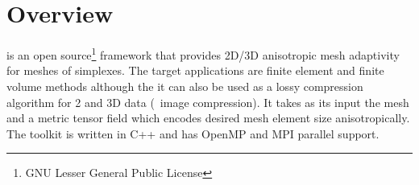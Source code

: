 \chapter*{Overview}
\pragmatic is an open source\footnote{GNU Lesser General Public
  License} framework that provides 2D/3D anisotropic mesh adaptivity
for meshes of simplexes. The target applications are finite element
and finite volume methods although the it can also be used as a lossy
compression algorithm for 2 and 3D data (\eg\ image compression). It
takes as its input the mesh and a metric tensor field which encodes
desired mesh element size anisotropically. The toolkit is written in
C++ and has OpenMP and MPI parallel support.

